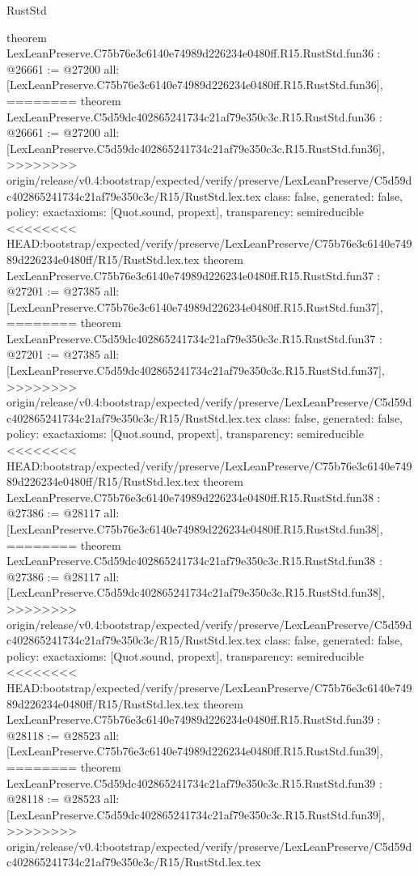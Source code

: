 \begin{lexlean}{RustStd}
\begin{coremodule}
{\begin{coremodule}
{{{{{{{{{{{{{{{{{{{{{{{{{{{{{{{{{{{{{{theorem LexLeanPreserve.C75b76e3c6140e74989d226234e0480ff.R15.RustStd.fun36 : @26661 := @27200 {
  all: [LexLeanPreserve.C75b76e3c6140e74989d226234e0480ff.R15.RustStd.fun36],
========
theorem LexLeanPreserve.C5d59dc402865241734c21af79e350c3c.R15.RustStd.fun36 : @26661 := @27200 {
  all: [LexLeanPreserve.C5d59dc402865241734c21af79e350c3c.R15.RustStd.fun36],
>>>>>>>> origin/release/v0.4:bootstrap/expected/verify/preserve/LexLeanPreserve/C5d59dc402865241734c21af79e350c3c/R15/RustStd.lex.tex
  class: false,
  generated: false,
  policy: exact{axioms: [Quot.sound, propext]},
  transparency: semireducible
}
<<<<<<<< HEAD:bootstrap/expected/verify/preserve/LexLeanPreserve/C75b76e3c6140e74989d226234e0480ff/R15/RustStd.lex.tex
theorem LexLeanPreserve.C75b76e3c6140e74989d226234e0480ff.R15.RustStd.fun37 : @27201 := @27385 {
  all: [LexLeanPreserve.C75b76e3c6140e74989d226234e0480ff.R15.RustStd.fun37],
========
theorem LexLeanPreserve.C5d59dc402865241734c21af79e350c3c.R15.RustStd.fun37 : @27201 := @27385 {
  all: [LexLeanPreserve.C5d59dc402865241734c21af79e350c3c.R15.RustStd.fun37],
>>>>>>>> origin/release/v0.4:bootstrap/expected/verify/preserve/LexLeanPreserve/C5d59dc402865241734c21af79e350c3c/R15/RustStd.lex.tex
  class: false,
  generated: false,
  policy: exact{axioms: [Quot.sound, propext]},
  transparency: semireducible
}
<<<<<<<< HEAD:bootstrap/expected/verify/preserve/LexLeanPreserve/C75b76e3c6140e74989d226234e0480ff/R15/RustStd.lex.tex
theorem LexLeanPreserve.C75b76e3c6140e74989d226234e0480ff.R15.RustStd.fun38 : @27386 := @28117 {
  all: [LexLeanPreserve.C75b76e3c6140e74989d226234e0480ff.R15.RustStd.fun38],
========
theorem LexLeanPreserve.C5d59dc402865241734c21af79e350c3c.R15.RustStd.fun38 : @27386 := @28117 {
  all: [LexLeanPreserve.C5d59dc402865241734c21af79e350c3c.R15.RustStd.fun38],
>>>>>>>> origin/release/v0.4:bootstrap/expected/verify/preserve/LexLeanPreserve/C5d59dc402865241734c21af79e350c3c/R15/RustStd.lex.tex
  class: false,
  generated: false,
  policy: exact{axioms: [Quot.sound, propext]},
  transparency: semireducible
}
<<<<<<<< HEAD:bootstrap/expected/verify/preserve/LexLeanPreserve/C75b76e3c6140e74989d226234e0480ff/R15/RustStd.lex.tex
theorem LexLeanPreserve.C75b76e3c6140e74989d226234e0480ff.R15.RustStd.fun39 : @28118 := @28523 {
  all: [LexLeanPreserve.C75b76e3c6140e74989d226234e0480ff.R15.RustStd.fun39],
========
theorem LexLeanPreserve.C5d59dc402865241734c21af79e350c3c.R15.RustStd.fun39 : @28118 := @28523 {
  all: [LexLeanPreserve.C5d59dc402865241734c21af79e350c3c.R15.RustStd.fun39],
>>>>>>>> origin/release/v0.4:bootstrap/expected/verify/preserve/LexLeanPreserve/C5d59dc402865241734c21af79e350c3c/R15/RustStd.lex.tex
}}}}}}}}}}}}}}}}}}}}}}}}}}}}}}}}}}}}}}}}}}}
\end{coremodule}}
\end{coremodule}
\end{lexlean}
